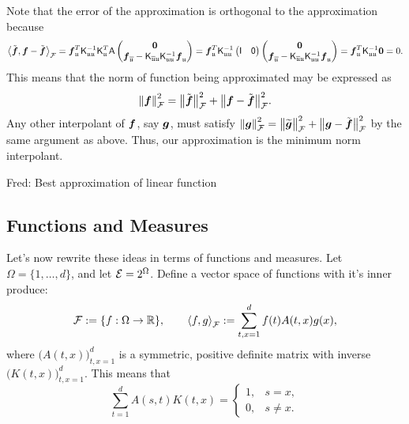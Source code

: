 \documentclass[reqno]{amsart}
\newcommand{\FredNote}[1]{{\color{blue}Fred: #1}}
\begin{document}
Note that the error of the approximation is orthogonal to the approximation because \begin{equation*}
    \ip[\cf]{\tvf}{\vf - \tvf} = \vf_\fu^T \mK^{-1}_{\fu\fu}  \mK_\fu^T \mA \begin{pmatrix} \vzero \\ \vf_{\overline{\fu}} - \mK_{\overline{\fu} \fu } \mK_{\fu\fu}^{-1} \vf_\fu \end{pmatrix} =  \vf_\fu^T \mK^{-1}_{\fu\fu}  \begin{pmatrix} \mI & \mzero \end{pmatrix} \begin{pmatrix} \vzero \\ \vf_{\overline{\fu}} - \mK_{\overline{\fu} \fu } \mK_{\fu\fu}^{-1} \vf_\fu \end{pmatrix}  
    = \vf_\fu^T \mK^{-1}_{\fu\fu} \vzero = 0.
\end{equation*}
This means that the norm of function being approximated may be expressed as
\begin{equation*}
    \norm[\cf]{\vf}^2 = \bignorm[\cf]{\tvf}^2 + \bignorm[\cf]{\vf - \tvf}^2.
\end{equation*}
Any other interpolant of $\vf$, say $\vg$, must satisfy $\norm[\cf]{\vg}^2 = \bignorm[\cf]{\tvg}^2 + \bignorm[\cf]{\vg - \tvf}^2$ by the same argument as above.  Thus, our approximation is the minimum norm interpolant.

\FredNote{Best approximation of linear function }



\subsection{Functions and Measures}
Let's now rewrite these ideas in terms of functions and measures.  Let $\Omega = \{1, \ldots, d\}$, and let $\ce = 2^\Omega$.  Define a vector space of functions with it's inner produce:
\begin{equation*}
    \cf : = \{f : \Omega \to \reals\}, \qquad \ip[\cf]{f}{g} := \sum_{t,x=1}^d f(t) A(t,x) g(x),
\end{equation*}
where $\bigl( A(t,x) \bigr)_{t,x = 1}^d$ is a symmetric, positive definite matrix with inverse $\bigl( K(t,x) \bigr)_{t,x = 1}^d$.  This means that
\begin{equation} \label{eq:AKeqI}
    \sum_{t=1}^d A(s,t)K(t,x) = \begin{cases} 1, & s=x, \\ 0, & s\ne x. \end{cases}
\end{equation}
\end{document}
